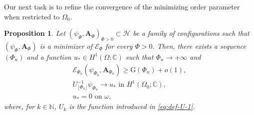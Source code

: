 \documentclass[11pt]{amsart}
\newcommand{\C}{\mathbb C}
\newcommand{\N}{\mathbb N}
\newcommand{\Ab}{\mathbf A}
\newcommand{\Ef}{\mathcal E_\Phi}
\newcommand{\cE}{\mathcal E}
\newcommand{\rG}{\mathrm G}
\newcommand{\cH}{\mathcal H}
\newtheorem{proposition}[theorem]{Proposition}
\theoremstyle{definition}
\numberwithin{equation}{section}
\begin{document}
%
Our next task is to refine the convergence of the minimizing order parameter when restricted to $\Omega_0$.
%
\begin{proposition}\label{prop:conv-min}
Let  $(\psi_\Phi,\Ab_\Phi)_{\Phi>0}\subset\cH$ be a family of configurations such that $(\psi_\Phi,\Ab_\Phi)$ is a minimizer of $\Ef$ for every $\Phi>0$. Then, there exists a sequence $(\Phi_n)$ and a function $u_*\in H^1(\Omega;\C)$ such that $\Phi_n\to+\infty$ and
\[\begin{gathered}
\cE_{\Phi_n}(\psi_{\Phi_n},\Ab_{\Phi_n})\geq \rG(\Phi_n)+o(1),\\
 U_{\lfloor\Phi_n\rfloor}^{-1}\psi_{\Phi_n}\to u_*\text{ in }H^1(\Omega_0;\C),\\
 u_*=0\text{ on }\omega,
 \end{gathered}\]
 where, for $k\in\N$, $U_k$ is the function introduced in \eqref{eq:def-U-1}.
\end{proposition}
%
\end{document}
